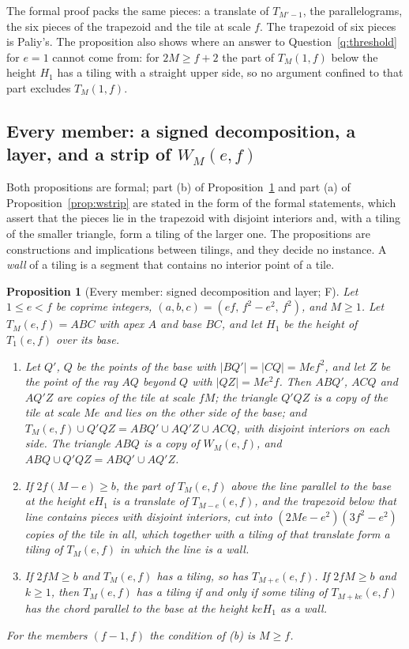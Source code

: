 \documentclass[11pt,reqno]{amsart}
\theoremstyle{plain}
\newtheorem{proposition}[theorem]{Proposition}
\theoremstyle{definition}
\newcommand{\sF}{\textup{\textsf{F}}}
\begin{document}
The formal proof packs the same pieces: a translate of $T_{M'-1}$, the
parallelograms, the six pieces of the trapezoid and the tile at scale $f$.
The trapezoid of six pieces is Paliy's. The proposition also shows where an answer to
Question~\ref{q:threshold} for $e=1$ cannot come from: for $2M\ge f+2$ the part of $T_M(1,f)$ below the
height $H_1$ has a tiling with a straight upper side, so no argument confined to that part excludes
$T_M(1,f)$.

\subsection{Every member: a signed decomposition, a layer, and a strip of $W_M(e,f)$}\label{sub:layerall}
Both propositions are formal; part \textup{(b)} of Proposition~\ref{prop:layerall} and part \textup{(a)} of
Proposition~\ref{prop:wstrip} are stated in the form of the formal statements, which assert that the pieces lie
in the trapezoid with disjoint interiors and, with a tiling of the smaller triangle, form a tiling of the
larger one. The propositions are constructions and implications between tilings, and they decide no instance.
A \emph{wall} of a tiling is a segment that contains no interior
point of a tile.

\begin{proposition}[Every member: signed decomposition and layer; \sF]\label{prop:layerall}
Let $1\le e<f$ be coprime integers, $(a,b,c)=(ef,\,f^2-e^2,\,f^2)$, and $M\ge1$. Let $T_M(e,f)=ABC$ with apex
$A$ and base $BC$, and let $H_1$ be the height of $T_1(e,f)$ over its base.
\begin{enumerate}
\item[\textup{(a)}] Let $Q'$, $Q$ be the points of the base with $|BQ'|=|CQ|=Mef^2$, and let $Z$ be the point of
the ray $AQ$ beyond $Q$ with $|QZ|=Me^2f$. Then $ABQ'$, $ACQ$ and $AQ'Z$ are copies of the tile at scale $fM$;
the triangle $Q'QZ$ is a copy of the tile at scale $Me$ and lies on the other side of the base; and
$T_M(e,f)\cup Q'QZ=ABQ'\cup AQ'Z\cup ACQ$, with disjoint interiors on each side. The triangle $ABQ$ is a copy
of $W_M(e,f)$, and $ABQ\cup Q'QZ=ABQ'\cup AQ'Z$.
\item[\textup{(b)}] If $2f(M-e)\ge b$, the part of $T_M(e,f)$ above the line parallel to the base at the height
$eH_1$ is a translate of $T_{M-e}(e,f)$, and the trapezoid below that line contains pieces with disjoint interiors,
cut into $(2Me-e^2)(3f^2-e^2)$ copies of the tile in all, which together with a tiling of that translate form a
tiling of $T_M(e,f)$ in which the line is a wall.
\item[\textup{(c)}] If $2fM\ge b$ and $T_M(e,f)$ has a tiling, so has $T_{M+e}(e,f)$. If $2fM\ge b$ and
$k\ge1$, then $T_M(e,f)$ has a tiling if and only if some tiling of $T_{M+ke}(e,f)$ has the chord parallel to
the base at the height $keH_1$ as a wall.
\end{enumerate}
For the members $(f-1,f)$ the condition of \textup{(b)} is $M\ge f$.
\end{proposition}
\end{document}
